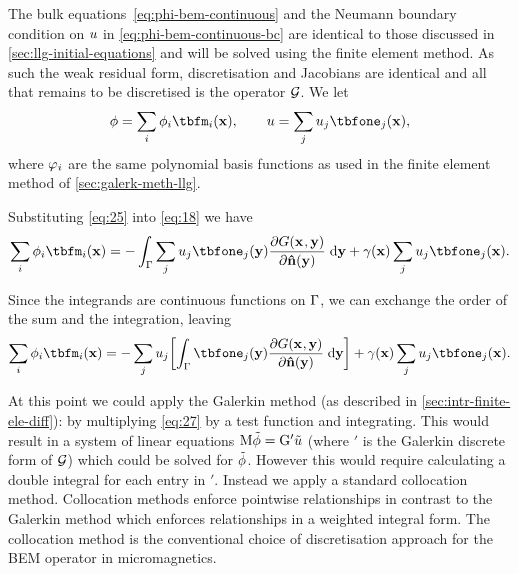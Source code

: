 The bulk equations~\cref{eq:phi-bem-continuous} and the Neumann boundary condition on $u$ in \cref{eq:phi-bem-continuous-bc} are identical to those discussed in \cref{sec:llg-initial-equations} and will be solved using the finite element method.
As such the weak residual form, discretisation and Jacobians are identical and all that remains to be discretised is the operator $\mathcal{G}$.
We let
\begin{equation}
  \phim = \sum_\ibasis \phim_{\ibasis} \tbfm_{\ibasis}(\xv),
  \qquad
  \phione = \sum_\ibasisb \phione_{\ibasisb} \tbfone_{\ibasisb}(\xv),
  \label{eq:25}
\end{equation}
where $\varphi_i$ are the same polynomial basis functions as used in the finite element method of \cref{sec:galerk-meth-llg}.

Substituting \cref{eq:25} into \cref{eq:18} we have
\begin{equation}
  \sum_\ibasis \phim_{\ibasis} \tbfm_{\ibasis}(\xv) =
  - \int_{\boundd} \sum_\ibasisb \phione_{\ibasisb} \tbfone_{\ibasisb}(\yv)
  \pd{\Green}{\nv(\yv)} \d \yv
   + \gamma(\xv) \sum_\ibasisb \phione_{\ibasisb} \tbfone_{\ibasisb}(\xv).
\end{equation}

Since the integrands are continuous functions on ${\Gamma}$, we can exchange the order of the sum and the integration, leaving
\begin{equation}
  \sum_\ibasis \phim_{\ibasis} \tbfm_{\ibasis}(\xv) =
  - \sum_\ibasisb  \phione_{\ibasisb}  \bigs{\int_{\boundd} \tbfone_{\ibasisb}(\yv)
    \pd{\Green}{\nv(\yv)} \d \yv }
  + \gamma(\xv) \sum_\ibasisb \phione_{\ibasisb} \tbfone_{\ibasisb}(\xv).
  \label{eq:27}
\end{equation}

At this point we could apply the Galerkin method (as described in \cref{sec:intr-finite-ele-diff}): by multiplying \cref{eq:27} by a test function and integrating.
This would result in a system of linear equations $\mathrm{M} \tilde{\phi} = {\mathbf{\mathrm{G}}}' \tilde{u}$ (where $\bm'$ is the Galerkin discrete form of $\mathcal{G}$) which could be solved for $\tilde{\phi}$.
However this would require calculating a double integral for each entry in $\bm'$.
Instead we apply a standard collocation method.
Collocation methods enforce pointwise relationships in contrast to the Galerkin method which enforces relationships in a weighted integral form.
The collocation method is the conventional choice of discretisation approach for the BEM operator in micromagnetics.

